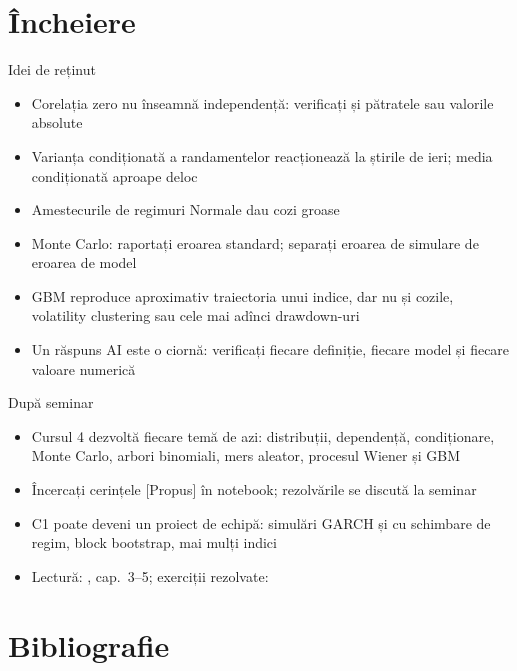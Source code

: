 \section{Încheiere}

\begin{frame}{Idei de reținut}
\itemsize{\small}
\begin{itemize}
    \item Corelația zero nu înseamnă independență: verificați și pătratele sau valorile absolute
    \item Varianța condiționată a randamentelor reacționează la știrile de ieri; media condiționată aproape deloc
    \item Amestecurile de regimuri Normale dau cozi groase
    \item Monte Carlo: raportați eroarea standard; separați eroarea de simulare de eroarea de model
    \item GBM reproduce aproximativ traiectoria unui indice, dar nu și cozile, volatility clustering sau cele mai adînci drawdown-uri
    \item Un răspuns AI este o ciornă: verificați fiecare definiție, fiecare model și fiecare valoare numerică
\end{itemize}
\end{frame}

\begin{frame}{După seminar}
\itemsize{\small}
\begin{itemize}
    \item Cursul 4 dezvoltă fiecare temă de azi: distribuții, dependență, condiționare, Monte Carlo, arbori binomiali, mers aleator, procesul Wiener și GBM
    \item Încercați cerințele [Propus] în notebook; rezolvările se discută la seminar
    \item C1 poate deveni un proiect de echipă: simulări GARCH și cu schimbare de regim, block bootstrap, mai mulți indici
    \item Lectură: , cap.~3--5; exerciții rezolvate: 
\end{itemize}
\end{frame}


\section{Bibliografie}

